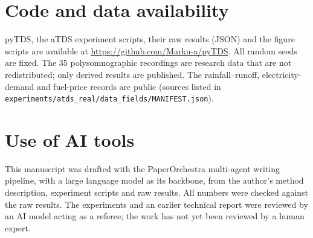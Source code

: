 \documentclass[11pt,a4paper]{article}
\begin{document}
\section*{Code and data availability}
pyTDS, the aTDS experiment scripts, their raw results (JSON) and the figure scripts are available at \url{https://github.com/Marku-a/pyTDS}. All random seeds are fixed. The 35 polysomnographic recordings are research data that are not redistributed; only derived results are published. The rainfall--runoff, electricity-demand and fuel-price records are public (sources listed in \texttt{experiments/atds\_real/data\_fields/MANIFEST.json}).

\section*{Use of AI tools}
This manuscript was drafted with the PaperOrchestra multi-agent writing pipeline, with a large language model as its backbone, from the author's method description, experiment scripts and raw results. All numbers were checked against the raw results. The experiments and an earlier technical report were reviewed by an AI model acting as a referee; the work has not yet been reviewed by a human expert.




\end{document}
